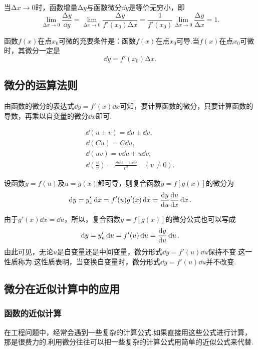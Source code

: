\begin{property}
当\(\increment x\to0\)时，函数增量\(\increment y\)与函数微分\(\dd{y}\)是等价无穷小，即\[
\lim\limits_{\increment x\to0} \frac{\increment y}{\dd{y}}
= \lim\limits_{\increment x\to0} \frac{\increment y}{f'(x_0) \increment x}
= \frac{1}{f'(x_0)} \lim\limits_{\increment x\to0} \frac{\increment y}{\increment x}
= 1.
\]
\end{property}

\begin{theorem}
函数\(f(x)\)在点\(x_0\)可微的充要条件是：函数\(f(x)\)在点\(x_0\)可导.当\(f(x)\)在点\(x_0\)可微时，其微分一定是\[
\dd{y}=f'(x_0)\increment x.
\]
\end{theorem}

\subsection{微分的运算法则}
由函数的微分的表达式\(\dd{y} = f'(x) \dd{x}\)可知，要计算函数的微分，只要计算函数的导数，再乘以自变量的微分\(\dd{x}\)即可.

\begin{theorem}
\begin{gather}
	\dd(u \pm v) = \dd{u}\pm\dd{v}, \\
	\dd(C u) = C \dd{u}, \\
	\dd(u v) = v \dd{u} + u \dd{v}, \\
	\dd(\frac{u}{v}) = \frac{v \dd{u} - u \dd{v}}{v^2} \quad (v \neq 0).
\end{gather}
\end{theorem}

\begin{theorem}[复合函数的微分法则]
设函数\(y=f(u)\)及\(u=g(x)\)都可导，则复合函数\(y=f[g(x)]\)的微分为\[
\dd{y}=y'_x\dd{x}=f'(u)g'(x)\dd{x}=\dv{y}{u}\dv{u}{x}\dd{x}.
\]

由于\(g'(x)\dd{x}=\dd{u}\)，所以，复合函数\(y=f[g(x)]\)的微分公式也可以写成\[
\dd{y}=y'_u\dd{u}=f'(u)\dd{u}=\dv{y}{u}\dd{u}.
\]由此可见，无论\(u\)是自变量还是中间变量，微分形式\(\dd{y}=f'(u)\dd{u}\)保持不变.这一性质称为.这性质表明，当变换自变量时，微分形式\(\dd{y}=f'(u)\dd{u}\)并不改变.
\end{theorem}

\subsection{微分在近似计算中的应用}
\subsubsection{函数的近似计算}
在工程问题中，经常会遇到一些复杂的计算公式.如果直接用这些公式进行计算，那是很费力的.利用微分往往可以把一些复杂的计算公式用简单的近似公式来代替.

